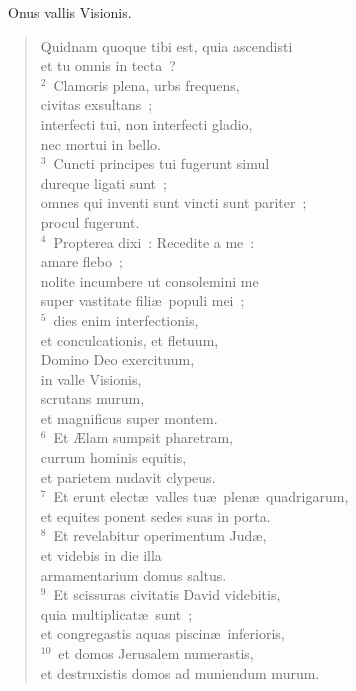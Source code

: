 ~\lettrine[lines=10,image=true,loversize=0.05,lraise=-0.03]{O}{}nus vallis Visionis. \begin{flushleft}\begin{verse}\vspace{6pt}Quidnam quoque tibi est, quia ascendisti\\ et tu omnis in tecta~?\\
${}^{2}$~Clamoris plena, urbs frequens,\\ civitas exsultans~;\\ interfecti tui, non interfecti gladio,\\ nec mortui in bello.\\
${}^{3}$~Cuncti principes tui fugerunt simul\\ dureque ligati sunt~;\\ omnes qui inventi sunt vincti sunt pariter~;\\ procul fugerunt.\\
${}^{4}$~Propterea dixi~: Recedite a me~:\\ amare flebo~;\\ nolite incumbere ut consolemini me\\ super vastitate fili\ae\ populi mei~;\\
${}^{5}$~dies enim interfectionis,\\ et conculcationis, et fletuum,\\ Domino Deo exercituum,\\ in valle Visionis,\\ scrutans murum,\\ et magnificus super montem.\\
${}^{6}$~Et \AE lam sumpsit pharetram,\\ currum hominis equitis,\\ et parietem nudavit clypeus.\\
${}^{7}$~Et erunt elect\ae\ valles tu\ae\ plen\ae\ quadrigarum,\\ et equites ponent sedes suas in porta.\\
${}^{8}$~Et revelabitur operimentum Jud\ae ,\\ et videbis in die illa\\ armamentarium domus saltus.\\
${}^{9}$~Et scissuras civitatis David videbitis,\\ quia multiplicat\ae\ sunt~;\\ et congregastis aquas piscin\ae\ inferioris,\\
${}^{10}$~et domos Jerusalem numerastis,\\ et destruxistis domos ad muniendum murum.\\

\end{verse}
\end{flushleft}
